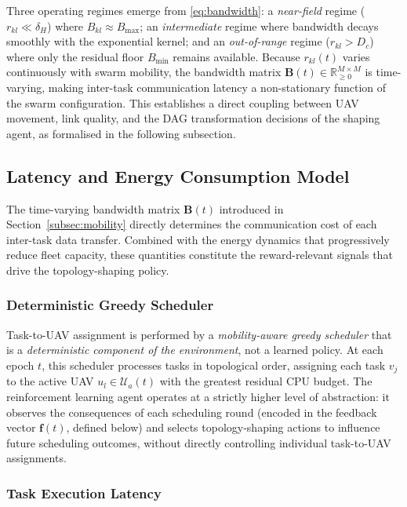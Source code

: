 Three operating regimes emerge from \eqref{eq:bandwidth}:
a \emph{near-field} regime ($r_{kl} \ll \delta_H$) where
$B_{kl} \approx B_{\max}$;
an \emph{intermediate} regime where bandwidth decays smoothly with
the exponential kernel; and
an \emph{out-of-range} regime ($r_{kl} > D_c$) where only the
residual floor $B_{\min}$ remains available.
Because $r_{kl}(t)$ varies continuously with swarm mobility, the
bandwidth matrix $\mathbf{B}(t) \in \mathbb{R}_{\geq 0}^{M \times M}$
is time-varying, making inter-task communication latency a
non-stationary function of the swarm configuration.
This establishes a direct coupling between UAV movement,
link quality, and the DAG transformation decisions of the
shaping agent, as formalised in the following subsection.

\subsection{Latency and Energy Consumption Model}
\label{subsec:latency_energy}

The time-varying bandwidth matrix $\mathbf{B}(t)$ introduced in
Section~\ref{subsec:mobility} directly determines the communication
cost of each inter-task data transfer.
Combined with the energy dynamics that progressively reduce fleet
capacity, these quantities constitute the reward-relevant signals
that drive the topology-shaping policy.

\subsubsection*{Deterministic Greedy Scheduler}

Task-to-UAV assignment is performed by a \emph{mobility-aware greedy
scheduler} that is a \emph{deterministic component of the environment},
not a learned policy.
At each epoch $t$, this scheduler processes tasks in topological
order, assigning each task $v_j$ to the active UAV
$u_l \in \mathcal{U}_a(t)$ with the greatest residual CPU budget.
The reinforcement learning agent operates at a strictly higher level
of abstraction: it observes the consequences of each scheduling round
(encoded in the feedback vector $\mathbf{f}(t)$, defined below) and
selects topology-shaping actions to influence future scheduling
outcomes, without directly controlling individual task-to-UAV
assignments.

\subsubsection*{Task Execution Latency}

